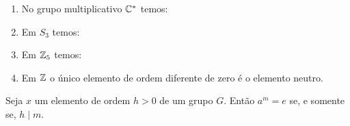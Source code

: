 \documentclass{beamer}
\begin{document}
    \begin{frame}
        \begin{exemplos}
            \begin{enumerate}[label={\arabic*})]
                \item No grupo multiplicativo $\mathbb{C}^*$ temos: \pause

                \item Em $S_3$ temos: \pause

                \item Em $\mathbb{Z}_5$ temos: \pause

                \item Em $\mathbb{Z}$ \pause o único elemento de ordem diferente de zero \pause é o elemento neutro.
            \end{enumerate}
        \end{exemplos}
    \end{frame}

    \begin{frame}
        \begin{proposicao}
            Seja $x$ um elemento de ordem $h > 0$ \pause de um grupo $G$. \pause Então $a^m = e$ \pause se, e somente se, $h \mid m$.
        \end{proposicao}
    \end{frame}
\end{document}
